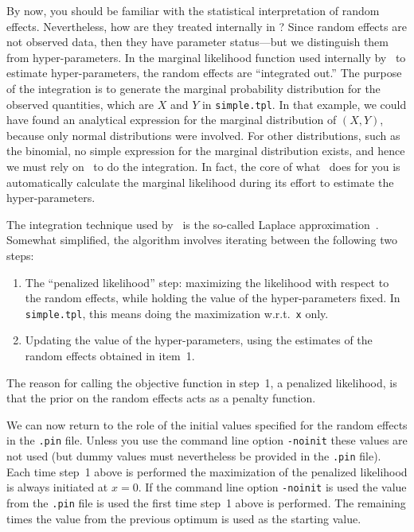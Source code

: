 \documentclass{admbmanual}
\begin{document}
By now, you should be familiar with the statistical interpretation of random
effects. Nevertheless, how are they treated internally in \scAR? Since random
effects are not observed data, then they have parameter status---but we
distinguish them from hyper-parameters. In the marginal likelihood function used
internally by \scAR\ to estimate hyper-parameters, the random effects are
``integrated out.'' The purpose of the integration is to generate the marginal
probability distribution for the observed quantities, which are $X$ and $Y$ in
\texttt{simple.tpl}. In that example, we could have found an analytical
expression for the marginal distribution of $(X,Y)$, because only normal
distributions were involved. For other distributions, such as the binomial, no
simple expression for the marginal distribution exists, and hence we must rely
on \scAB\ to do the integration. In fact, the core of what \scAR\ does for you
is automatically calculate the marginal likelihood during its effort to estimate
the hyper-parameters. 

The integration technique used by \scAR\ is the so-called Laplace
approximation~\cite{skaug_fournier1996aam}. Somewhat simplified, the algorithm
involves iterating between the following two steps:
\begin{enumerate}
  \item The ``penalized likelihood'' step: maximizing the likelihood with
  respect to the random effects, while holding the value of the hyper-parameters
  fixed. In \texttt{simple.tpl}, this means doing the maximization
  w.r.t.~\texttt{x} only.

  \item Updating the value of the hyper-parameters, using the estimates of the
  random effects obtained in item~1.
\end{enumerate}
The reason for calling the objective function in step~1, a penalized likelihood,
is that the prior on the random effects acts as a penalty function.

We can now return to the role of the initial values specified for the random
effects in the \texttt{.pin} file. Unless you use the command line option \texttt{-noinit}
these values are not used (but dummy values must nevertheless be provided
in the \texttt{.pin} file).  Each time step~1 above is performed
the maximization of the penalized likelihood is always initiated at $x=0$.
If the command line option \texttt{-noinit} is used the value
from the \texttt{.pin} file is used the first time step~1 above is performed.
The remaining times the value from the previous optimum is used as the starting value.
\end{document}
